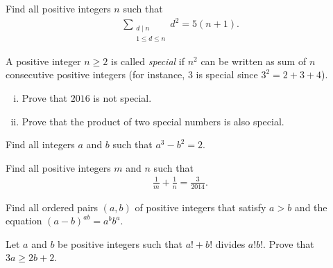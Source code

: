 \documentclass[problems.tex]{subfile}
\begin{document}
	
	
	\begin{problem}
		Find all positive integers $n$ such that
		\begin{align*}
			\sum_{\substack{d \mid n \\ 1 \leq d \leq n}} d^2 = 5(n+1).
		\end{align*}
	\end{problem}
	
	
	\begin{problem}
		A positive integer $n \geq 2$ is called \textit{special} if $n^2$ can be written as sum of $n$ consecutive positive integers (for instance, $3$ is special since $3^2 = 2 + 3 + 4$).
		\begin{enumerate}[(i)]
			\item Prove that $2016$ is not special.
			\item Prove that the product of two special numbers is also special.
		\end{enumerate}
	\end{problem}
	
	
	\begin{problem}
		Find all integers $a$ and $b$ such that $a^3 - b^2 = 2$.
	\end{problem}
	
	
	\begin{problem}
		Find all positive integers $m$ and $n$ such that
		\begin{align*}
			\frac{1}{m} + \frac{1}{n} = \frac{3}{2014}.
		\end{align*}
	\end{problem}
	
	
	
	\begin{problem}
		Find all ordered pairs $(a,b)$ of positive integers that satisfy $a>b$ and the equation $(a-b)^{ab}=a^bb^a$. %
	\end{problem}
	
	
	
	\begin{problem}
		Let $a$ and $b$ be positive integers such that $a! + b!$ divides $a!b!$. Prove that $3a \ge 2b + 2$. %
	\end{problem}
	
\end{document}
